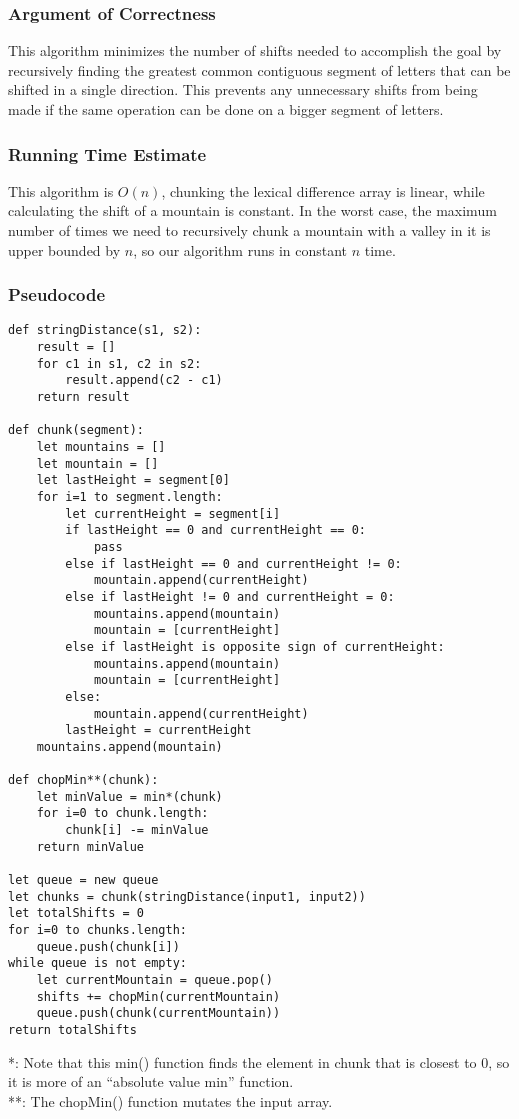 \documentclass{math}
\begin{document}
\subsubsection*{Argument of Correctness}
This algorithm minimizes the number of shifts needed to accomplish the goal by
recursively finding the greatest common contiguous segment of letters that can
be shifted in a single direction. This prevents any unnecessary shifts from
being made if the same operation can be done on a bigger segment of letters.

\subsubsection*{Running Time Estimate}
This algorithm is \( O(n) \), chunking the lexical difference array is linear,
while calculating the shift of a mountain is constant. In the worst case, the
maximum number of times we need to recursively chunk a mountain with a valley
in it is upper bounded by \( n \), so our algorithm runs in constant \( n \)
time.

\subsubsection*{Pseudocode}
\begin{lstlisting}
def stringDistance(s1, s2):
    result = []
    for c1 in s1, c2 in s2:
        result.append(c2 - c1)
    return result

def chunk(segment):
    let mountains = []
    let mountain = []
    let lastHeight = segment[0]
    for i=1 to segment.length:
        let currentHeight = segment[i]
        if lastHeight == 0 and currentHeight == 0:
            pass
        else if lastHeight == 0 and currentHeight != 0:
            mountain.append(currentHeight)
        else if lastHeight != 0 and currentHeight = 0:
            mountains.append(mountain)
            mountain = [currentHeight]
        else if lastHeight is opposite sign of currentHeight:
            mountains.append(mountain)
            mountain = [currentHeight]
        else:
            mountain.append(currentHeight)
        lastHeight = currentHeight
    mountains.append(mountain)

def chopMin**(chunk):
    let minValue = min*(chunk)
    for i=0 to chunk.length:
        chunk[i] -= minValue
    return minValue

let queue = new queue
let chunks = chunk(stringDistance(input1, input2))
let totalShifts = 0
for i=0 to chunks.length:
    queue.push(chunk[i])
while queue is not empty:
    let currentMountain = queue.pop()
    shifts += chopMin(currentMountain)
    queue.push(chunk(currentMountain))
return totalShifts
\end{lstlisting}
*: Note that this min() function finds the element in chunk that is closest to
0, so it is more of an ``absolute value min'' function. \\
**: The chopMin() function mutates the input array. \\
\end{document}
